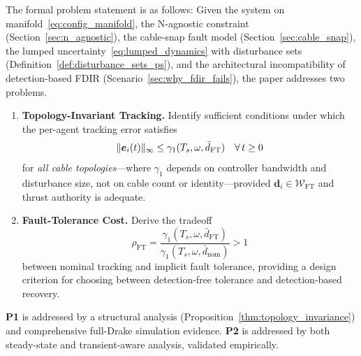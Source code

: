 The formal problem statement is as follows: Given the system on manifold~\eqref{eq:config_manifold}, the N-agnostic constraint (Section~\ref{sec:n_agnostic}), the cable-snap fault model (Section~\ref{sec:cable_snap}), the lumped uncertainty~\eqref{eq:lumped_dynamics} with disturbance sets (Definition~\ref{def:disturbance_sets_ps}), and the architectural incompatibility of detection-based FDIR (Scenario~\ref{sec:why_fdir_fails}), the paper addresses two problems.

\begin{enumerate}[label=\textbf{P\arabic*.},leftmargin=*]
  \item \textbf{Topology-Invariant Tracking.} Identify sufficient conditions under which the per-agent tracking error satisfies
  \begin{equation}\label{eq:problem_bound}
    \lVert \bm{e}_i(t) \rVert_\infty \leq \gamma_1(T_s, \omega, \bar{d}_{\mathrm{FT}}) \quad \forall\, t \geq 0
  \end{equation}
  for \emph{all cable topologies}---where $\gamma_1$ depends on controller bandwidth and disturbance size, not on cable count or identity---provided $\bm{d}_i \in \mathcal{W}_{\mathrm{FT}}$ and thrust authority is adequate.

  \item \textbf{Fault-Tolerance Cost.} Derive the tradeoff
  \begin{equation}\label{eq:problem_rho}
    \rho_{\mathrm{FT}} = \frac{\gamma_1(T_s, \omega, \bar{d}_{\mathrm{FT}})}{\gamma_1(T_s, \omega, \bar{d}_{\mathrm{nom}})} > 1
  \end{equation}
  between nominal tracking and implicit fault tolerance, providing a design criterion for choosing between detection-free tolerance and detection-based recovery.
\end{enumerate}

\textbf{P1} is addressed by a structural analysis (Proposition~\ref{thm:topology_invariance}) and comprehensive full-Drake simulation evidence. \textbf{P2} is addressed by both steady-state and transient-aware analysis, validated empirically.
